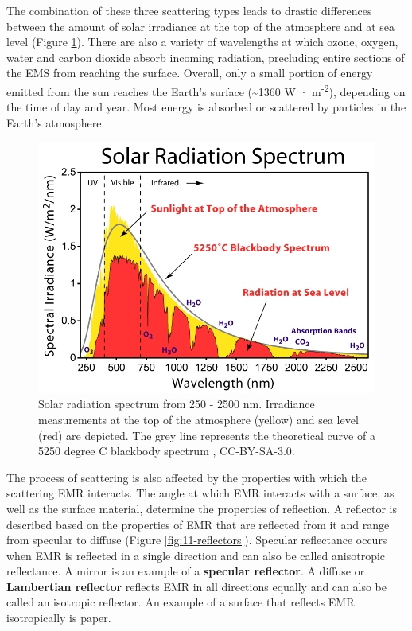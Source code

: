 \documentclass[
]{book}
\begin{document}
The combination of these three scattering types leads to drastic differences between the amount of solar irradiance at the top of the atmosphere and at sea level (Figure \ref{fig:11-solar-radiation}). There are also a variety of wavelengths at which ozone, oxygen, water and carbon dioxide absorb incoming radiation, precluding entire sections of the EMS from reaching the surface. Overall, only a small portion of energy emitted from the sun reaches the Earth's surface (\textasciitilde1360 W · m\textsuperscript{-2}), depending on the time of day and year. Most energy is absorbed or scattered by particles in the Earth's atmosphere.



\begin{figure}
\includegraphics[width=0.75\linewidth]{images/11-solar-radiation} \caption{Solar radiation spectrum from 250 - 2500 nm. Irradiance measurements at the top of the atmosphere (yellow) and sea level (red) are depicted. The grey line represents the theoretical curve of a 5250 degree C blackbody spectrum \citep{rohde_solar_2008}, CC-BY-SA-3.0.}\label{fig:11-solar-radiation}
\end{figure}

The process of scattering is also affected by the properties with which the scattering EMR interacts. The angle at which EMR interacts with a surface, as well as the surface material, determine the properties of reflection. A reflector is described based on the properties of EMR that are reflected from it and range from specular to diffuse (Figure \ref{fig:11-reflectors}). Specular reflectance occurs when EMR is reflected in a single direction and can also be called anisotropic reflectance. A mirror is an example of a \textbf{specular reflector}. A diffuse or \textbf{Lambertian reflector} reflects EMR in all directions equally and can also be called an isotropic reflector. An example of a surface that reflects EMR isotropically is paper.
\end{document}
